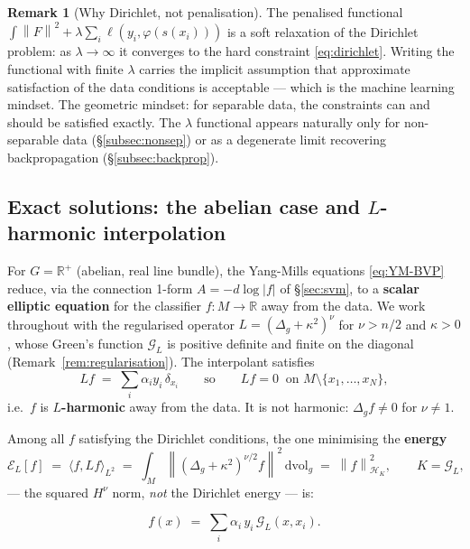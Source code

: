 \documentclass[11pt, a4paper]{article}
\theoremstyle{plain}
\theoremstyle{definition}
\newtheorem{remark}[theorem]{Remark}
\newcommand{\R}{\mathbb{R}}
\newcommand{\norm}[1]{\left\|#1\right\|}
\newcommand{\Gr}{\mathcal{G}}   %
\begin{document}
\begin{remark}[Why Dirichlet, not penalisation]
The penalised functional $\int\norm{F}^2 + \lambda\sum_i\ell(y_i,\varphi(s(x_i)))$
is a soft relaxation of the Dirichlet problem: as $\lambda \to \infty$ it converges
to the hard constraint \eqref{eq:dirichlet}. Writing the functional with finite
$\lambda$ carries the implicit assumption that approximate satisfaction of the data
conditions is acceptable --- which is the machine learning mindset. The geometric
mindset: for separable data, the constraints can and should be satisfied exactly.
The $\lambda$ functional appears naturally only for non-separable data
(\S\ref{subsec:nonsep}) or as a degenerate limit recovering backpropagation
(\S\ref{subsec:backprop}).
\end{remark}

\subsection{Exact solutions: the abelian case and $L$-harmonic interpolation}
\label{subsec:abelian}

For $G = \mathbb{R}^+$ (abelian, real line bundle), the Yang-Mills equations \eqref{eq:YM-BVP} reduce,
via the connection 1-form $A = -d\log|f|$ of \S\ref{sec:svm}, to a
\textbf{scalar elliptic equation} for the classifier $f: M \to \R$ away from
the data. We work throughout with the regularised operator
$L = (\Delta_g + \kappa^2)^\nu$ for $\nu > n/2$ and $\kappa > 0$, whose
Green's function $\Gr_L$ is positive definite and finite on the diagonal
(Remark~\ref{rem:regularisation}). The interpolant satisfies
\[
  L f \;=\; \sum_i \alpha_i y_i\, \delta_{x_i}
  \qquad\text{so}\qquad
  Lf = 0 \ \text{ on } M \setminus \{x_1,\dots,x_N\} ,
\]
i.e.\ $f$ is \textbf{$L$-harmonic} away from the data. It is not harmonic:
$\Delta_g f \neq 0$ for $\nu \neq 1$.

Among all $f$ satisfying the Dirichlet conditions, the one minimising the
\textbf{energy}
\[
  \mathcal{E}_L[f] \;=\; \langle f, Lf\rangle_{L^2}
  \;=\; \int_M \norm{(\Delta_g+\kappa^2)^{\nu/2} f}^2\,\mathrm{dvol}_g
  \;=\; \norm{f}^2_{\mathcal{H}_K}, \qquad K = \Gr_L,
\]
--- the squared $H^\nu$ norm, \emph{not} the Dirichlet energy --- is:

\begin{equation}\label{eq:harmonic}
  \boxed{f(x) \;=\; \sum_i \alpha_i\,y_i\,\Gr_L(x, x_i).}
\end{equation}
\end{document}
